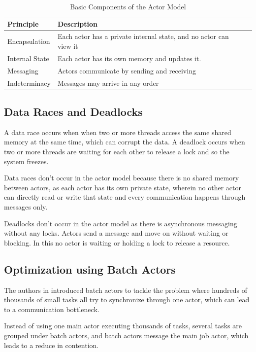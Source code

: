 \begin{table}[h]
    \centering
    \caption{Basic Components of the Actor Model}
    \label{tab:actor_model}
    \begin{tabularx}{\textwidth}{|l|X|X|}
        \hline
        \textbf{Principle} & \textbf{Description} \\
        \hline
        Encapsulation & Each actor has a private internal state, and no actor can view it \\
        \hline
        Internal State & Each actor has its own memory and updates it. \\
        \hline
        Messaging & Actors communicate by sending and receiving \\
        \hline
        Indeterminacy & Messages may arrive in any order \\
        \hline
        
    \end{tabularx}
\end{table}

\subsection{Data Races and Deadlocks}
A data race occurs when when two or more threads access the same shared memory at the same time, which can corrupt the data. A deadlock occurs when two or more threads are waiting for each other to release a lock and so the system freezes. 

Data races don't occur in the actor model because there is no shared memory between actors, as each actor has its own private state, wherein no other actor can directly read or write that state and every communication happens through messages only. 

Deadlocks don't occur in the actor model as there is asynchronous messaging without any locks. Actors send a message and move on without waiting or blocking. In this no actor is waiting or holding a lock to release a resource.

\subsection{Optimization using Batch Actors}
The authors in \cite{10820772} introduced batch actors to tackle the problem where hundreds of thousands of small tasks all try to synchronize through one actor, which can lead to a communication bottleneck.

Instead of using one main actor executing thousands of tasks, several tasks are grouped under batch actors, and batch actors message the main job actor, which leads to a reduce in contention. 


